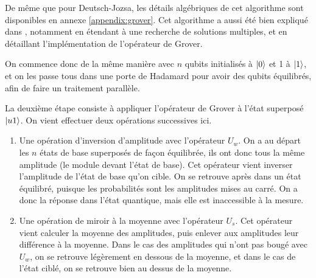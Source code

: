 De même que pour Deutsch-Jozsa, les détails algébriques de cet algorithme sont disponibles en annexe \ref{appendix:grover}. Cet algorithme a aussi été bien expliqué dans \cite{borbely2007grover}, notamment en étendant à une recherche de solutions multiples, et en détaillant l'implémentation de l'opérateur de Grover.

On commence donc de la même manière avec $n$ qubits initialisés à $\ket{0}$ et 1 à $\ket{1}$, et on les passe tous dans une porte de Hadamard pour avoir des qubits équilibrés, afin de faire un traitement parallèle.

La deuxième étape consiste à appliquer l'opérateur de Grover à l'état superposé $\ket{u1}$. On vient effectuer deux opérations successives ici.

\begin{enumerate}
  \item Une opération d'inversion d'amplitude avec l'opérateur $U_w$. On a au départ les $n$ états de base superposés de façon équilibrée, ils ont donc tous la même amplitude (le module devant l'état de base). Cet opérateur vient inverser l'amplitude de l'état de base qu'on cible. On se retrouve après dans un état équilibré, puisque les probabilités sont les amplitudes mises au carré. On a donc la réponse dans l'état quantique, mais elle est inaccessible à la mesure.
  \item Une opération de miroir à la moyenne avec l'opérateur $U_s$. Cet opérateur vient calculer la moyenne des amplitudes, puis enlever aux amplitudes leur différence à la moyenne. Dans le cas des amplitudes qui n'ont pas bougé avec $U_w$, on se retrouve légèrement en dessous de la moyenne, et dans le cas de l'état ciblé, on se retrouve bien au dessus de la moyenne.
\end{enumerate}

